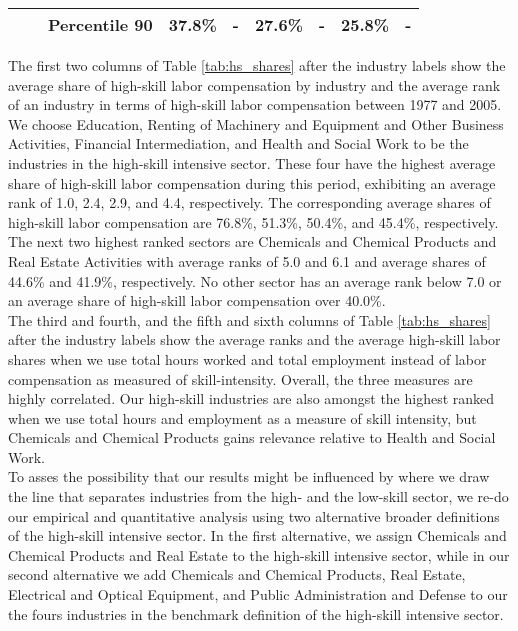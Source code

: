 \documentclass[10pt]{article}
\begin{document}
\begin{table}[!h]
{\begin{tabular}{cc|lcccccc}
\multicolumn{1}{l}{\textbf{}}     & \multicolumn{1}{l|}{}     & \multicolumn{1}{l|}{\textbf{Percentile 90}}                                                 & 37.8\% & \multicolumn{1}{c|}{-}                           & 27.6\% & \multicolumn{1}{c|}{-}                           & 25.8\%              & -                 \\ \hline \hline
\end{tabular}
}
\end{table}

The first two columns of Table \ref{tab:hs_shares} after the industry labels show the average share of high-skill labor compensation by industry and the average rank of an industry in terms of high-skill labor compensation between 1977 and 2005. We choose Education, Renting of Machinery and Equipment and Other Business Activities, Financial Intermediation, and Health and Social Work to be the industries in the high-skill intensive sector. These  four  have  the  highest  average  share  of  high-skill  labor  compensation during this period, exhibiting an average rank of 1.0, 2.4, 2.9, and 4.4, respectively. The corresponding average shares of high-skill labor compensation are 76.8\%, 51.3\%, 50.4\%, and 45.4\%, respectively. The next  two  highest  ranked  sectors  are  Chemicals  and  Chemical  Products  and  Real  Estate  Activities  with average ranks of 5.0 and 6.1 and average shares of 44.6\% and 41.9\%, respectively.  No other sector has an average rank below 7.0 or an average share of high-skill labor compensation over 40.0\%.\\

The third and fourth, and the fifth and sixth columns of Table \ref{tab:hs_shares} after the industry labels show the average ranks and the average high-skill labor shares when we use total hours worked and total employment instead of labor compensation as measured of skill-intensity. Overall, the three measures are highly correlated. Our high-skill industries are also amongst the highest ranked when we use total hours and employment as a measure of skill intensity, but Chemicals and Chemical Products gains relevance relative to Health and Social Work.\\

To asses the possibility that our results might be influenced by where we draw the line that separates industries from the high- and the low-skill sector, we re-do our empirical and quantitative analysis using two alternative broader definitions of the high-skill intensive sector. In the first alternative, we assign Chemicals and Chemical Products and Real Estate to the high-skill intensive sector, while in our second alternative we add Chemicals and Chemical Products, Real Estate, Electrical and Optical Equipment, and Public Administration and Defense to our the fours industries in the benchmark definition of the high-skill intensive sector.\\
\end{document}
